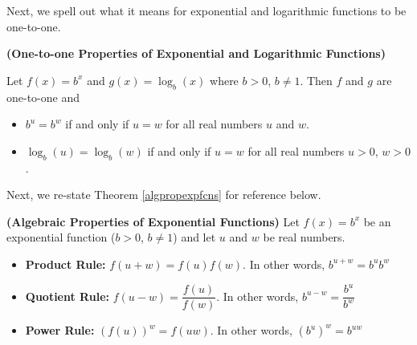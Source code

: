Next, we spell out what it means for exponential and logarithmic functions to be one-to-one.

\smallskip

\colorbox{ResultColor}{\bbm

\begin{thm}  \label{explogsonetoone} \textbf{(One-to-one Properties of Exponential and Logarithmic Functions)} 

Let $f(x) = b^{x}$ and $g(x) = \log_{b}(x)$ where $b>0$, $b\neq 1$.  Then $f$ and $g$ are one-to-one and  

\vspace{-.1in}

\begin{itemize}

\item  $b^{u} = b^{w}$ if and only if $u=w$ for all real numbers $u$ and $w$.

\item  $\log_{b}(u) = \log_{b}(w)$ if and only if $u=w$ for all real numbers $u > 0$, $w > 0$.

\end{itemize}

\end{thm}

\ebm}

\smallskip


Next, we re-state Theorem \ref{algpropexpfcns} for reference below.

\smallskip

\colorbox{ResultColor}{\bbm

\begin{thm}  \textbf{(Algebraic Properties of Exponential Functions)}  Let $f(x) = b^{x}$ be an exponential function ($b > 0$, $b\neq 1$) and let $u$ and $w$ be real numbers. 

\begin{itemize}

\item  \textbf{Product Rule:}  $f(u+w) = f(u) f(w)$.  In other words, $b^{u+w} = b^{u} b^{w}$

\item  \textbf{Quotient Rule:}  $f(u-w) = \dfrac{f(u)}{f(w)}$.  In other words, $b^{u-w} = \dfrac{b^{u}}{b^{w}}$

\item  \textbf{Power Rule:}  $\left(f(u)\right)^w = f(uw)$.  In other words, $\left(b^{u}\right)^{w} = b^{uw}$

\end{itemize}

\end{thm}

\ebm}

